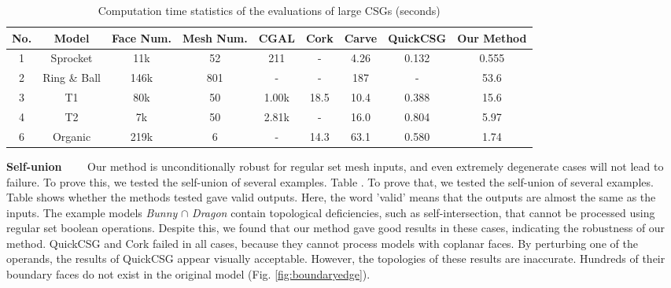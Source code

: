 \begin{table*}[ht]
\caption{Computation time statistics of the evaluations of large CSGs (seconds)}
\label{tab:performance2}
\centering
\begin{tabular}{*{8}{c|}c}%
\hline
{No.} & {Model} & {Face Num.} & {Mesh Num.} &
CGAL  & Cork & Carve & QuickCSG & Our Method
\\
\hline\hline
1 & Sprocket & 11k & 52 & 211  & - & 4.26 & 0.132 & 0.555\\
2 & Ring \& Ball & 146k & 801 & -  & - & 187 & - & 53.6\\
3 & T1 & 80k & 50 & 1.00k & 18.5 & 10.4 & 0.388 & 15.6\\
4 & T2 & 7k & 50 & 2.81k & - & 16.0 & 0.804 & 5.97 \\
6 & Organic & 219k & 6 & - & 14.3 & 63.1 & 0.580 & 1.74\\
\hline
\end{tabular}
\begin{flushleft}
\end{flushleft}
\end{table*}



\vspace{0.5em}
\noindent\textbf{Self-union}~~~~
Our method is unconditionally robust for regular set mesh inputs, and even extremely degenerate cases will not lead to failure. To prove this, we tested the self-union of several examples. Table . To prove that, we tested the self-union of several examples. Table  shows whether the methods tested gave valid outputs. Here, the word 'valid' means that the outputs are almost the same as the inputs. The example models \emph{Bunny} $\cap$ \emph{Dragon}  contain topological deficiencies, such as self-intersection, that cannot be processed using regular set boolean operations. Despite this, we found that our method gave good results in these cases, indicating the robustness of our method. QuickCSG and Cork failed in all cases, because they cannot process models with coplanar faces. By perturbing one of the operands, the results of QuickCSG appear visually acceptable. However, the topologies of these results are inaccurate. Hundreds of their boundary faces do not exist in the original model (Fig.  \ref{fig:boundaryedge}).


